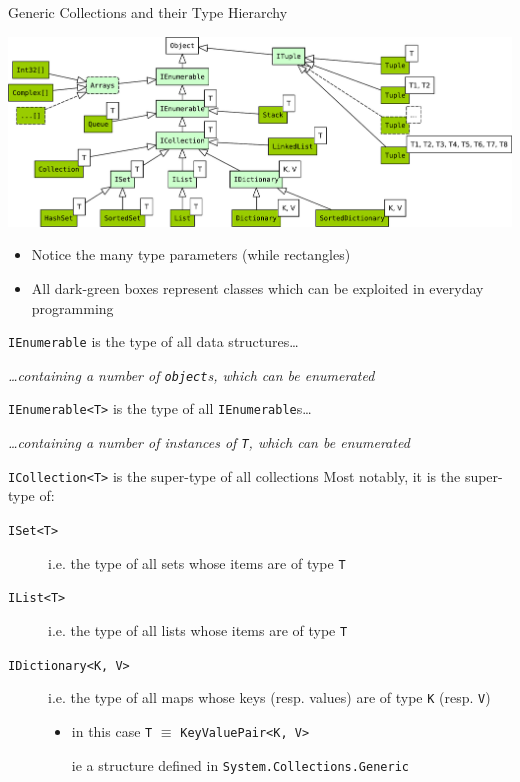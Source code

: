 \documentclass[presentation]{beamer}
\begin{document}
\begin{frame}[allowframebreaks]{Generic Collections and their Type Hierarchy}
  \begin{center}
    \includegraphics[width=\linewidth]{img/dotnet-collections.pdf}
  \end{center}
  \begin{itemize}
    \item Notice the many \alert{type parameters} (while rectangles)
    \item All dark-green boxes represent classes which can be exploited in everyday programming
  \end{itemize}

  \begin{block}{\texttt{IEnumerable} is the type of all data structures\ldots}
    \begin{center}\itshape
      \ldots containing a number of \alert{\texttt{object}s}, which can be \alert{enumerated}
    \end{center}
  \end{block}

  \begin{block}{\texttt{IEnumerable<T>} is the type of all \texttt{IEnumerable}s\ldots}
    \begin{center}\itshape
      \ldots containing a number of instances of \alert{\texttt{T}}, which can be \alert{enumerated}
    \end{center}
  \end{block}

  \begin{block}{\texttt{ICollection<T>} is the super-type of all collections}
    Most notably, it is the super-type of:
    \begin{description}
      \item[\texttt{ISet<T>}] i.e. the type of all \alert{sets} whose items are of type \alert{\texttt{T}}
      \item[\texttt{IList<T>}] i.e. the type of all \alert{lists} whose items are of type \alert{\texttt{T}} 
      \item[\texttt{IDictionary<K, V>}] i.e. the type of all \alert{maps} whose \alert{keys} (resp. \alert{values}) are of type \alert{\texttt{K}} (resp. \alert{\texttt{V}})
      \begin{itemize}
        \item in this case \texttt{T} $\equiv$ \texttt{\alert{KeyValuePair<K, V>}}
        \item[ie] a structure defined in \texttt{System.Collections.Generic}
      \end{itemize} 
    \end{description}
  \end{block}


\end{frame}
\end{document}
